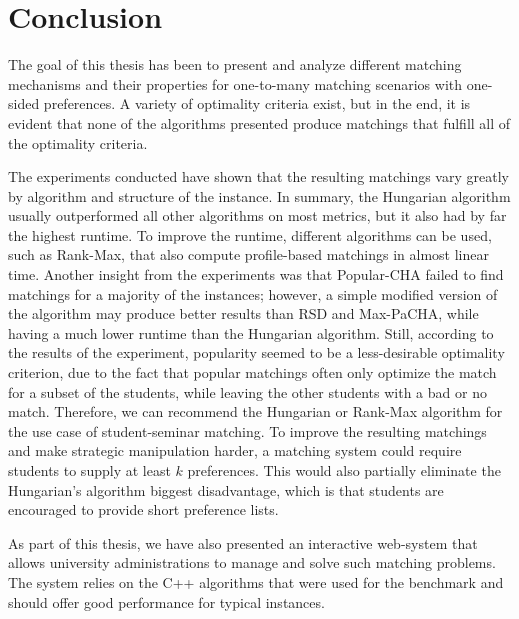 \section{Conclusion}

The goal of this thesis has been to present and analyze different matching mechanisms and their properties for one-to-many matching scenarios with one-sided preferences. A variety of optimality criteria exist, but in the end, it is evident that none of the algorithms presented produce matchings that fulfill all of the optimality criteria. 

The experiments conducted have shown that the resulting matchings vary greatly by algorithm and structure of the instance. In summary, the Hungarian algorithm usually outperformed all other algorithms on most metrics, but it also had by far the highest runtime. To improve the runtime, different algorithms can be used, such as Rank-Max, that also compute profile-based matchings in almost linear time. Another insight from the experiments was that Popular-CHA failed to find matchings for a majority of the instances; however, a simple modified version of the algorithm may produce better results than RSD and Max-PaCHA, while having a much lower runtime than the Hungarian algorithm. Still, according to the results of the experiment, popularity seemed to be a less-desirable optimality criterion, due to the fact that popular matchings often only optimize the match for a subset of the students, while leaving the other students with a bad or no match. Therefore, we can recommend the Hungarian or Rank-Max algorithm for the use case of student-seminar matching. To improve the resulting matchings and make strategic manipulation harder, a matching system could require students to supply at least $k$ preferences. This would also partially eliminate the Hungarian's algorithm biggest disadvantage, which is that students are encouraged to provide short preference lists.

As part of this thesis, we have also presented an interactive web-system that allows university administrations to manage and solve such matching problems. The system relies on the C++ algorithms that were used for the benchmark and should offer good performance for typical instances.  